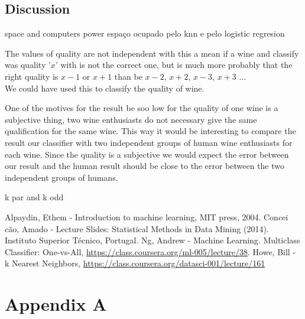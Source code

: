 \documentclass[twoside]{article}
\begin{document}
\begin{multicols}{2}
\section{Discussion}

space and computers power
espaço ocupado pelo knn e pelo logistic regresion

The values of quality are not independent with this a mean if a wine and classify was quality '$x$' with is not the correct one, but is much more probably that the right quality is $x-1$ or $x+1$ than be $x-2$, $x+2$, $x-3$, $x+3$ ... \\
We could have used this to classify the quality of wine.


One of the motives for the result be soo low for the quality of one wine is a subjective thing, two wine enthusiasts do not necessary give the same qualification for the same wine. This way it would be interesting to compare the result our classifier with two independent groups of human wine enthusiasts for each wine. Since the quality is a subjective we would expect the error between our result and the human result should be close to the error between the two independent groups of humans.





k par and k odd 


%
%


{}
\begin{thebibliography}{}	
  Alpaydin, Ethem -   
  Introduction to machine learning, 
  MIT press,
  2004.
  Concei\,{c}\~{a}o, Amado -
  Lecture Slides: Statistical Methods in Data Mining (2014). Instituto Superior Técnico, Portugal.  
  Ng, Andrew - 
  Machine Learning. Multiclass Classifier: One-vs-All,
  \url{https://class.coursera.org/ml-005/lecture/38}.
  Howe, Bill - 
  k Nearest Neighbors,
  \url{https://class.coursera.org/datasci-001/lecture/161}

  
\end{thebibliography}
\end{multicols}
\newpage
\section*{Appendix A}


\end{document}
